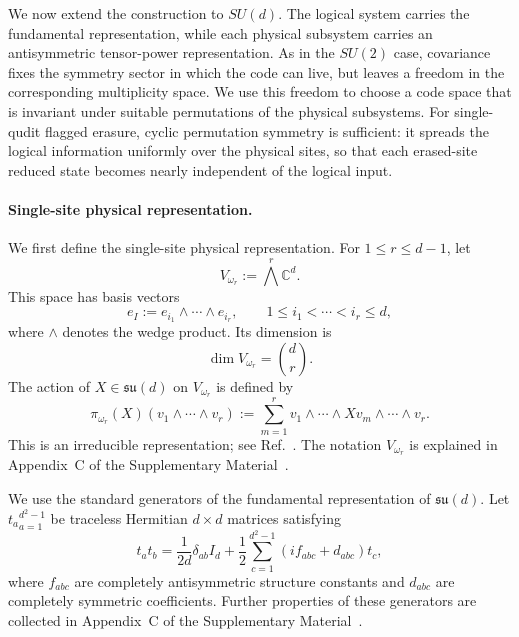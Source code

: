 \documentclass[10pt,twocolumn,superscriptaddress,aps,amsmath,amssymb,citeautoscript,floatfix,prx]{revtex4-2}
\theoremstyle{plain}
\theoremstyle{plain}
\theoremstyle{plain}
\theoremstyle{plain}
\theoremstyle{plain}
\theoremstyle{plain}
\begin{document}
We now extend the construction to $SU(d)$. The logical system carries the fundamental representation, while each physical subsystem carries an antisymmetric tensor-power representation. As in the $SU(2)$ case, covariance fixes the symmetry sector in which the code can live, but leaves a freedom in the corresponding multiplicity space. We use this freedom to choose a code space that is invariant under suitable permutations of the physical subsystems. For single-qudit flagged erasure, cyclic permutation symmetry is sufficient: it spreads the logical information uniformly over the physical sites, so that each erased-site reduced state becomes nearly independent of the logical input.

\paragraph{Single-site physical representation.}

We first define the single-site physical representation. For $1\le r\le d-1$, let
\begin{equation}\label{eq:vomegar_def}
V_{\omega_r}:=\bigwedge^r \mathbb C^d .
\end{equation}
This space has basis vectors
$$
e_I:=e_{i_1}\wedge\cdots\wedge e_{i_r},
\qquad
1\le i_1<\cdots<i_r\le d,
$$
where $\wedge$ denotes the wedge product. Its dimension is
$$
\dim V_{\omega_r}=\binom{d}{r}.
$$
The action of $X\in\mathfrak{su}(d)$ on $V_{\omega_r}$ is defined by
\begin{equation}\label{eq:sud_vomegar_def}
\pi_{\omega_r}(X)
\left(v_1\wedge\cdots\wedge v_r\right)
:=
\sum_{m=1}^r
v_1\wedge\cdots\wedge Xv_m\wedge\cdots\wedge v_r .
\end{equation}
This is an irreducible representation; see Ref.~\cite{FultonHarris1991}. The notation $V_{\omega_r}$ is explained in Appendix~C of the Supplementary Material~\cite{SuppMat}.

We use the standard generators of the fundamental representation of $\mathfrak{su}(d)$. Let ${t_a}_{a=1}^{d^2-1}$ be traceless Hermitian $d\times d$ matrices satisfying
\begin{equation}
t_a t_b
=
\frac{1}{2d}\delta_{ab}I_d
+
\frac12
\sum_{c=1}^{d^2-1}
\left(i f_{abc}+d_{abc}\right)t_c ,
\end{equation}
where $f_{abc}$ are completely antisymmetric structure constants and $d_{abc}$ are completely symmetric coefficients. Further properties of these generators are collected in Appendix~C of the Supplementary Material~\cite{SuppMat}.
\end{document}
